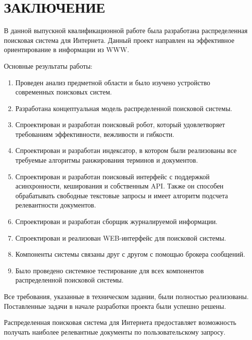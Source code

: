 \section*{ЗАКЛЮЧЕНИЕ}

В данной выпускной квалификационной работе была разработана распределенная поисковая система для Интернета. Данный проект направлен на эффективное ориентирование в информации из WWW.

Основные результаты работы:

\begin{enumerate}
	\item Проведен анализ предметной области и было изучено устройство современных поисковых систем.
	\item Разработана концептуальная модель распределенной поисковой системы.
	\item Спроектирован и разработан поисковый робот, который удовлетворяет требованиям эффективности, вежливости и гибкости.
	\item Спроектирован и разработан индексатор, в котором были реализованы все требуемые алгоритмы ранжирования терминов и документов.
	\item Спроектирован и разработан поисковый интерфейс с поддержкой асинхронности, кеширования и собственным API. Также он способен обрабатывать свободные текстовые запросы и имеет алгоритм подсчета релевантности документов.
	\item Спроектирован и разработан сборщик журналируемой информации.
	\item Спроектирован и реализован WEB-интерфейс для поисковой системы.
	\item Компоненты системы связаны друг с другом с помощью брокера сообщений.
	\item Было проведено системное тестирование для всех компонентов распределенной поисковой системы.
\end{enumerate}

Все требования, указанные в техническом задании, были полностью реализованы. Поставленные задачи в начале разработки проекта были успешно решены.
	
Распределенная поисковая система для Интернета предоставляет возможность получать наиболее релевантные документы по пользовательскому запросу.